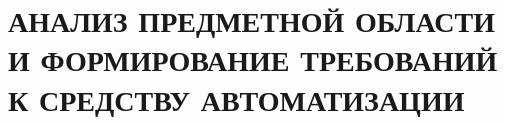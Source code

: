 \section{\large{АНАЛИЗ ПРЕДМЕТНОЙ ОБЛАСТИ И ФОРМИРОВАНИЕ ТРЕБОВАНИЙ К СРЕДСТВУ АВТОМАТИЗАЦИИ}}





